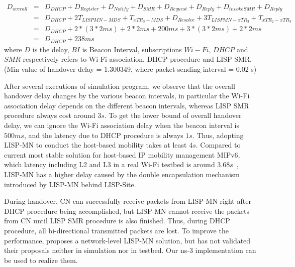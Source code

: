 \begin{eqnarray}
	D_{overall} &=& D_{DHCP} + D_{Register} + D_{Notify} + D_{SMR} + D_{Request} + D_{Reply} + D_{invokeSMR} + D_{Reply} \nonumber \\
	&=& D_{DHCP} + 2T_{LISPMN-MDS} + T_{xTR_3-MDS} + D_{Resolve} + 3T_{LISPMN-xTR_3} + T_{xTR_2-xTR_3} \nonumber \\
	&=& D_{DHCP} + 2* (3*2ms) + 2*2ms + 200ms + 3*(3*2ms) + 2*2ms \nonumber \\
	&=& D_{DHCP} + 238 ms
\end{eqnarray}
where $D$ is the delay, $BI$ is Beacon Interval, subscriptions $Wi-Fi$, $DHCP$ and $SMR$ respectively refers to Wi-Fi association, DHCP procedure and LISP SMR. (Min value of handover delay = 1.300349, where packet sending interval = 0.02 s) 

After several executions of simulation program, we observe that the overall handover delay changes by the various beacon intervals, in particular the Wi-Fi association delay depends on the different beacon intervals, whereas LISP SMR procedure always cost around $3s$. To get the lower bound of overall handover delay, we can ignore the Wi-Fi association delay when the beacon interval is $500ms$, and the latency due to DHCP procedure is always $1s$. Thus, adopting LISP-MN to conduct the host-based mobility takes at least $4s$. Compared to current most stable solution for host-based IP mobility management MIPv6, which latency including L2 and L3 in a real Wi-Fi testbed is around $3.68s$~\cite{vassiliou2010analysis}, LISP-MN has a higher delay caused by the double encapsulation mechanism introduced by LISP-MN behind LISP-Site. 

During handover, CN can successfully receive packets from LISP-MN right after DHCP procedure being accomplished, but LISP-MN cannot receive the packets from CN until LISP SMR procedure is also finished. Thus, during DHCP procedure, all bi-directional transmitted packets are lost. To improve the performance, \cite{tang2017lisp} proposes a network-level LISP-MN solution, but has not validated their proposals neither in simulation nor in testbed. Our ns-3 implementation can be used to realize them.

